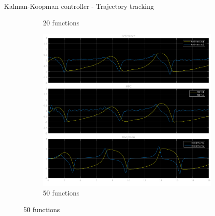 \documentclass{beamer}
\begin{document}
\begin{frame}{Kalman-Koopman controller - Trajectory tracking}
\begin{figure}
\begin{subfigure}[b]{0.3\textwidth}
            \caption{20 functions}
        \end{subfigure}
        \hfill
        \begin{subfigure}[b]{0.3\textwidth}
            \centering
            \includegraphics[width=\textwidth]{KK_50_Ref.png}
            \caption{50 functions}
        \end{subfigure}
    \end{figure}
\end{frame}
\end{document}
